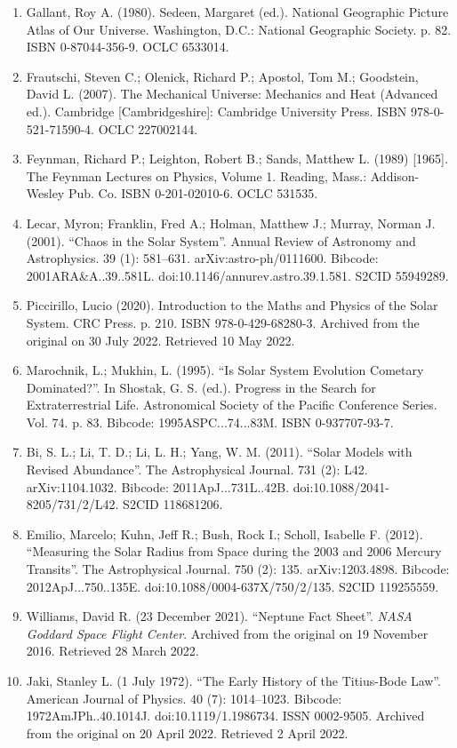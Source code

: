 \begin{enumerate}
\item Gallant, Roy A. (1980). Sedeen, Margaret (ed.). National Geographic Picture Atlas of Our Universe. Washington, D.C.: National Geographic Society. p. 82. ISBN 0-87044-356-9. OCLC 6533014.
\item Frautschi, Steven C.; Olenick, Richard P.; Apostol, Tom M.; Goodstein, David L. (2007). The Mechanical Universe: Mechanics and Heat (Advanced ed.). Cambridge [Cambridgeshire]: Cambridge University Press. ISBN 978-0-521-71590-4. OCLC 227002144.
\item Feynman, Richard P.; Leighton, Robert B.; Sands, Matthew L. (1989) [1965]. The Feynman Lectures on Physics, Volume 1. Reading, Mass.: Addison-Wesley Pub. Co. ISBN 0-201-02010-6. OCLC 531535.
\item Lecar, Myron; Franklin, Fred A.; Holman, Matthew J.; Murray, Norman J. (2001). ``Chaos in the Solar System''. Annual Review of Astronomy and Astrophysics. 39 (1): 581–631. arXiv:astro-ph/0111600. Bibcode: 2001ARA\&A..39..581L. doi:10.1146/annurev.astro.39.1.581. S2CID 55949289.
\item Piccirillo, Lucio (2020). Introduction to the Maths and Physics of the Solar System. CRC Press. p. 210. ISBN 978-0-429-68280-3. Archived from the original on 30 July 2022. Retrieved 10 May 2022.
\item Marochnik, L.; Mukhin, L. (1995). ``Is Solar System Evolution Cometary Dominated?''. In Shostak, G. S. (ed.). Progress in the Search for Extraterrestrial Life. Astronomical Society of the Pacific Conference Series. Vol. 74. p. 83. Bibcode: 1995ASPC...74...83M. ISBN 0-937707-93-7.
\item Bi, S. L.; Li, T. D.; Li, L. H.; Yang, W. M. (2011). ``Solar Models with Revised Abundance''. The Astrophysical Journal. 731 (2): L42. arXiv:1104.1032. Bibcode: 2011ApJ...731L..42B. doi:10.1088/2041-8205/731/2/L42. S2CID 118681206.
\item Emilio, Marcelo; Kuhn, Jeff R.; Bush, Rock I.; Scholl, Isabelle F. (2012). ``Measuring the Solar Radius from Space during the 2003 and 2006 Mercury Transits''. The Astrophysical Journal. 750 (2): 135. arXiv:1203.4898. Bibcode: 2012ApJ...750..135E. doi:10.1088/0004-637X/750/2/135. S2CID 119255559.
\item Williams, David R. (23 December 2021). ``Neptune Fact Sheet''. \textit{NASA Goddard Space Flight Center}. Archived from the original on 19 November 2016. Retrieved 28 March 2022.
\item Jaki, Stanley L. (1 July 1972). ``The Early History of the Titius-Bode Law''. American Journal of Physics. 40 (7): 1014–1023. Bibcode: 1972AmJPh..40.1014J. doi:10.1119/1.1986734. ISSN 0002-9505. Archived from the original on 20 April 2022. Retrieved 2 April 2022.

\end{enumerate}
